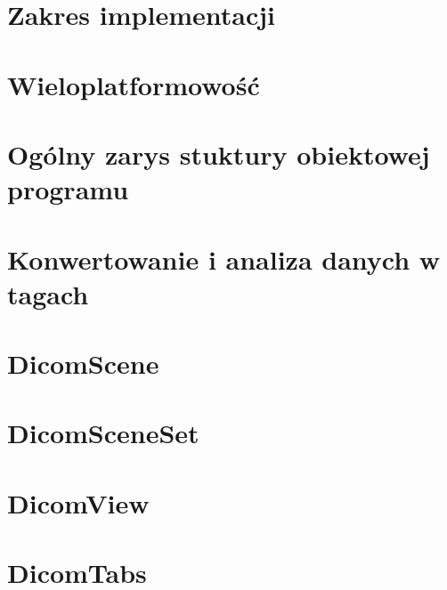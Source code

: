 

\section{Zakres implementacji}


\section{Wieloplatformowość}


\section{Ogólny zarys stuktury obiektowej programu}
\sokarclassExplanations


\section{Konwertowanie i analiza danych w tagach}


\section{DicomScene}


\section{DicomSceneSet}


\section{DicomView}


\section{DicomTabs}

